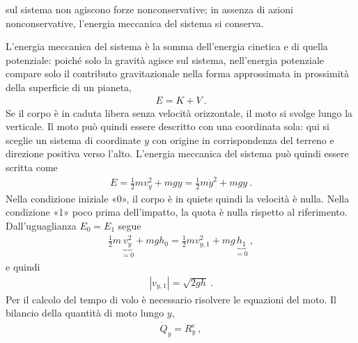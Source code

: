 \documentclass[letterpaper,10pt,italian]{jupyterBook}
\begin{document}
\sphinxAtStartPar
sul sistema non agiscono forze non\sphinxhyphen{}conservative; in assenza di azioni non\sphinxhyphen{}conservative, l’energia meccanica del sistema si conserva.

\sphinxAtStartPar
L’energia meccanica del sistema è la somma dell’energia cinetica e di quella potenziale: poiché solo la gravità agisce sul sistema, nell’energia potenziale compare solo il contributo gravitazionale \sphinxhyphen{} nella forma approssimata in prossimità della superficie di un pianeta,
\begin{equation*}
\begin{split}E = K + V \ .\end{split}
\end{equation*}
\sphinxAtStartPar
Se il corpo è in caduta libera senza velocità orizzontale, il moto si svolge lungo la verticale. Il moto può quindi essere descritto con una coordinata sola: qui si sceglie un sistema di coordinate \(y\) con origine in corrispondenza del terreno e direzione positiva verso l’alto. L’energia meccanica del sistema può quindi essere scritta come
\begin{equation*}
\begin{split}E = \frac{1}{2} m v_y^2 + m g y = \frac{1}{2} m \dot{y}^2 + m g y \ .\end{split}
\end{equation*}
\sphinxAtStartPar
Nella condizione iniziale «0», il corpo è in quiete quindi la velocità è nulla. Nella condizione «1» poco prima dell’impatto, la quota è nulla rispetto al riferimento. Dall’uguaglianza \(E_0 = E_1\) segue
\begin{equation*}
\begin{split}\frac{1}{2} m \underbrace{v_y^2}_{=0} + m g h_0 = \frac{1}{2} m v_{y,1}^2 + m g \underbrace{h_1}_{=0} \ ,\end{split}
\end{equation*}
\sphinxAtStartPar
e quindi
\begin{equation*}
\begin{split}|v_{y,1}| = \sqrt{2 g h} \ .\end{split}
\end{equation*}
\sphinxAtStartPar
{} Per il calcolo del tempo di volo è necessario risolvere le equazioni del moto. Il bilancio della quantità di moto lungo \(y\),
\begin{equation*}
\begin{split}\dot{Q}_y = R^e_y \ ,\end{split}
\end{equation*}
\end{document}
